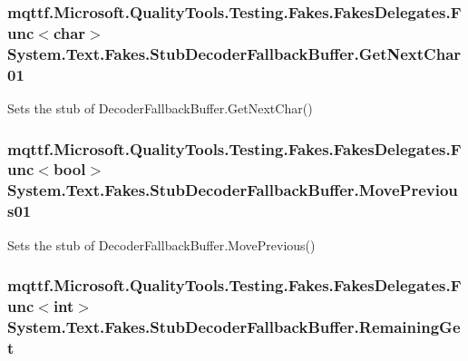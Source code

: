 \hypertarget{class_system_1_1_text_1_1_fakes_1_1_stub_decoder_fallback_buffer_afc0577c7dd57e61452f1a45dee67fc90}{
\subsubsection[{Get\-Next\-Char01}]{\setlength{\rightskip}{0pt plus 5cm}mqttf.\-Microsoft.\-Quality\-Tools.\-Testing.\-Fakes.\-Fakes\-Delegates.\-Func$<$char$>$ System.\-Text.\-Fakes.\-Stub\-Decoder\-Fallback\-Buffer.\-Get\-Next\-Char01}}\label{class_system_1_1_text_1_1_fakes_1_1_stub_decoder_fallback_buffer_afc0577c7dd57e61452f1a45dee67fc90}


Sets the stub of Decoder\-Fallback\-Buffer.\-Get\-Next\-Char()

\hypertarget{class_system_1_1_text_1_1_fakes_1_1_stub_decoder_fallback_buffer_a86bc7abcad6ec1c3461fbbad0c7dcd0e}{
\subsubsection[{Move\-Previous01}]{\setlength{\rightskip}{0pt plus 5cm}mqttf.\-Microsoft.\-Quality\-Tools.\-Testing.\-Fakes.\-Fakes\-Delegates.\-Func$<$bool$>$ System.\-Text.\-Fakes.\-Stub\-Decoder\-Fallback\-Buffer.\-Move\-Previous01}}\label{class_system_1_1_text_1_1_fakes_1_1_stub_decoder_fallback_buffer_a86bc7abcad6ec1c3461fbbad0c7dcd0e}


Sets the stub of Decoder\-Fallback\-Buffer.\-Move\-Previous()

\hypertarget{class_system_1_1_text_1_1_fakes_1_1_stub_decoder_fallback_buffer_a6ba9d359ce5161b94505829e9dfb720f}{
\subsubsection[{Remaining\-Get}]{\setlength{\rightskip}{0pt plus 5cm}mqttf.\-Microsoft.\-Quality\-Tools.\-Testing.\-Fakes.\-Fakes\-Delegates.\-Func$<$int$>$ System.\-Text.\-Fakes.\-Stub\-Decoder\-Fallback\-Buffer.\-Remaining\-Get}}\label{class_system_1_1_text_1_1_fakes_1_1_stub_decoder_fallback_buffer_a6ba9d359ce5161b94505829e9dfb720f}


